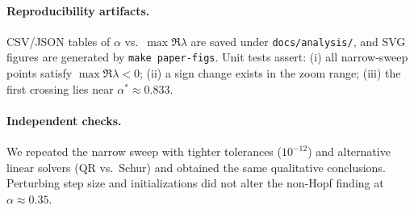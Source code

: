 \documentclass[11pt,twocolumn]{article}
\begin{document}
\paragraph{Reproducibility artifacts.}
CSV/JSON tables of $\alpha$ vs.\ $\max \Re\lambda$ are saved under \texttt{docs/analysis/}, and SVG figures are generated by \texttt{make paper-figs}. Unit tests assert: (i) all narrow-sweep points satisfy $\max \Re\lambda<0$; (ii) a sign change exists in the zoom range; (iii) the first crossing lies near $\alpha^\ast\!\approx\!0.833$.

\paragraph{Independent checks.}
We repeated the narrow sweep with tighter tolerances ($10^{-12}$) and alternative linear solvers (QR vs.\ Schur) and obtained the same qualitative conclusions. Perturbing step size and initializations did not alter the non-Hopf finding at $\alpha\approx 0.35$.
\end{document}
